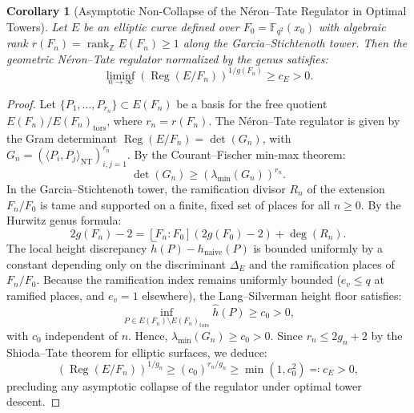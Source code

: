 \documentclass[11pt,reqno]{article}
\theoremstyle{plain}
\newtheorem{corollary}[theorem]{Corollary}
\theoremstyle{definition}
\DeclareMathOperator{\rank}{rank}
\DeclareMathOperator{\Reg}{Reg}
\begin{document}
\begin{corollary}[Asymptotic Non-Collapse of the Néron--Tate Regulator in Optimal Towers]
\label{cor:gs_regulator_noncollapse}
Let $E$ be an elliptic curve defined over $F_0 = \mathbb{F}_{q^2}(x_0)$ with algebraic rank $r(F_n) = \rank_{\mathbb{Z}} E(F_n) \ge 1$ along the Garcia--Stichtenoth tower. Then the geometric Néron--Tate regulator normalized by the genus satisfies:
\begin{equation}
    \label{eq:gs_regulator_bound}
    \liminf_{n \to \infty} \left( \Reg(E/F_n) \right)^{1/g(F_n)} \ge c_E > 0.
\end{equation}
\end{corollary}

\begin{proof}
Let $\{P_1, \dots, P_{r_n}\} \subset E(F_n)$ be a basis for the free quotient $E(F_n)/E(F_n)_{\mathrm{tors}}$, where $r_n = r(F_n)$. The Néron--Tate regulator is given by the Gram determinant $\Reg(E/F_n) = \det(G_n)$, with $G_n = (\langle P_i, P_j \rangle_{\mathrm{NT}})_{i,j=1}^{r_n}$. By the Courant--Fischer min-max theorem:
\begin{equation}
    \det(G_n) \ge (\lambda_{\min}(G_n))^{r_n}.
\end{equation}
In the Garcia--Stichtenoth tower, the ramification divisor $R_n$ of the extension $F_n/F_0$ is tame and supported on a finite, fixed set of places for all $n \ge 0$. By the Hurwitz genus formula:
\begin{equation}
    2 g(F_n) - 2 = [F_n : F_0](2 g(F_0) - 2) + \deg(R_n).
\end{equation}
The local height discrepancy $\hat{h}(P) - h_{\mathrm{naive}}(P)$ is bounded uniformly by a constant depending only on the discriminant $\Delta_E$ and the ramification places of $F_n/F_0$. Because the ramification index remains uniformly bounded ($e_v \le q$ at ramified places, and $e_v = 1$ elsewhere), the Lang--Silverman height floor satisfies:
\begin{equation}
    \inf_{P \in E(F_n) \setminus E(F_n)_{\mathrm{tors}}} \hat{h}(P) \ge c_0 > 0,
\end{equation}
with $c_0$ independent of $n$. Hence, $\lambda_{\min}(G_n) \ge c_0 > 0$. Since $r_n \le 2 g_n + 2$ by the Shioda--Tate theorem for elliptic surfaces, we deduce:
\begin{equation}
    \left( \Reg(E/F_n) \right)^{1/g_n} \ge (c_0)^{r_n / g_n} \ge \min(1, c_0^2) \eqqcolon c_E > 0,
\end{equation}
precluding any asymptotic collapse of the regulator under optimal tower descent.
\end{proof}
\end{document}

